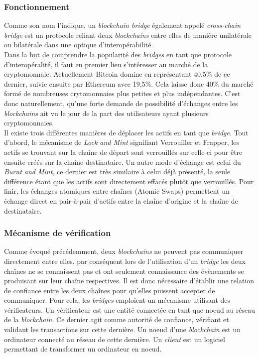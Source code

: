 
\subsubsection{Fonctionnement}

Comme son nom l’indique, un \textit{\gls{blockchain} bridge} également appelé \textit{\gls{cross-chain} bridge} est un protocole reliant deux \textit{\gls{blockchain}s} entre elles de manière unilatérale ou bilatérale dans une optique d’interopérabilité.\\

Dans la but de comprendre la popularité des \textit{bridges} en tant que protocole d’interopéralité, il faut en premier lieu s’intéresser au marché de la cryptomonnaie. Actuellement \gls{Bitcoin} domine en représentant 40,5\% de ce dernier, suivie ensuite par \gls{Ethereum} avec 19,5\%. Cela laisse donc 40\% du marché formé de nombreuses crytomonnaies plus petites et plus indépendantes. C’est donc naturellement, qu’une forte demande de possibilité d’échanges entre les \textit{\gls{blockchain}s} ait vu le jour de la part des utilisateurs ayant plusieurs cryptomonnaies\cite{NgraveNumbers}.\\

Il existe trois différentes manières de déplacer les \gls{actif}s en tant que \textit{bridge}. Tout d’abord, le mécanisme de \textit{Lock and Mint} signifiant Verrouiller et Frapper, les \gls{actif}s se trouvant sur la chaîne de départ sont verrouillés sur celle-ci pour être ensuite créés sur la chaîne destinataire. Un autre mode d'échange est celui du \textit{Burnt and Mint}, ce dernier est très similaire à celui déjà présenté, la seule différence étant que les \gls{actif}s sont directement effacés plutôt que verrouillés. Pour finir, les échanges atomiques entre chaînes (Atomic Swaps) permettent un échange direct en pair-à-pair d'\gls{actif}s entre la chaîne d’origine et la chaîne de destinataire.\cite{EthereumMechanism}

\subsubsection{Mécanisme de vérification}

Comme évoqué précédemment, deux \textit{\gls{blockchain}s} ne peuvent pas communiquer directement entre elles, par conséquent lors de l’utilisation d’un \textit{bridge} les deux chaînes ne se connaissent pas et ont seulement connaissance des évènements se produisant sur leur chaîne respectives. Il est donc nécessaire d’établir une relation de confiance entre les deux chaînes pour qu’elles puissent accepter de communiquer. Pour cela, les \textit{bridges} emploient un mécanisme utilisant des vérificateurs. Un vérificateur est une entité connectée en tant que noeud au réseau de la \textit{blockchain}. Ce dernier agit comme autorité de confiance, vérifiant et validant les transactions sur cette dernière. Un noeud d'une \textit{blockchain} est un ordinateur connecté au réseau de cette dernière. Un \textit{client} est un logiciel permettant de transformer un ordinateur en noeud. \cite{EthereumNodeClient} \\


